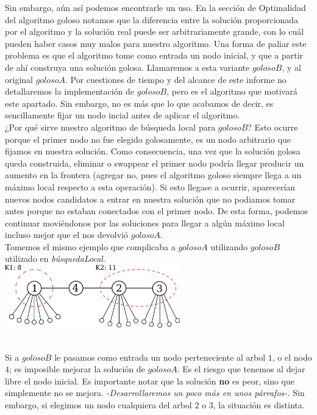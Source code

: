 Sin embargo, aún así podemos encontrarle un uso. En la sección de Optimalidad del algoritmo goloso notamos que la diferencia entre la solución proporcionada por el algoritmo y la solución real puede ser arbitrariamente grande, con lo cuál pueden haber casos muy malos para nuestro algoritmo. Una forma de paliar este problema es que el algoritmo tome como entrada un nodo inicial, y que a partir de ahí construya una solución golosa. Llamaremos a esta variante $golosoB$, y al original $golosoA$. Por cuestiones de tiempo y del alcance de este informe no detallaremos la implementación de $golosoB$, pero es el algoritmo que motivará este apartado. Sin embargo, no es más que lo que acabamos de decir, es sencillamente fijar un nodo incial antes de aplicar el algoritmo. \\

¿Por qué sirve nuestro algoritmo de búsqueda local para $golosoB$? Esto ocurre porque el primer nodo no fue elegido golosamente, es un nodo arbitrario que fijamos en nuestra solución. Como consecuencia, una vez que la solución golosa queda construida, eliminar o swappear el primer nodo podría llegar producir un aumento en la frontera (agregar no, pues el algoritmo goloso siempre llega a un máximo local respecto a esta operación). Si esto llegase a ocurrir, aparecerían nuevos nodos candidatos a entrar en nuestra solución que no podiamos tomar antes porque no estaban conectados con el primer nodo. De esta forma, podemos continuar moviéndonos por las soluciones para llegar a algún máximo local incluso mejor que el nos devolvió $golosoA$. \\

Tomemos el mismo ejemplo que complicaba a $golosoA$ utilizando $golosoB$ utilizado en \textit{búsquedaLocal}. \\

{\centering
    \includegraphics[width=0.57\textwidth]{informe/imgs/greedy_base_nodes_v2.png} \\
}
$ $\newline

Si a $golosoB$ le pasamos como entrada un nodo perteneciente al arbol $1$, o el nodo $4$; es imposible mejorar la solución de $golosoA$. Es el riesgo que tenemos al dejar libre el nodo inicial. Es importante notar que la solución \textbf{no} es peor, sino que simplemente no se mejora. \textit{-Desarrollaremos un poco más en unos párrafos-.} Sin embargo, si elegimos un nodo cualquiera del arbol $2$ o $3$, la situación es distinta. \\

